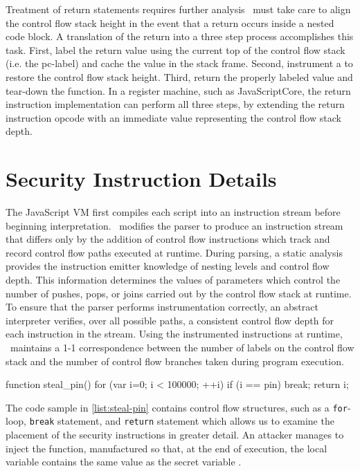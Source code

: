 Treatment of return statements requires further analysis
\FlowCore\ must take care to align the control flow stack height in the event that a return occurs inside a nested code block.
A translation of the return into a three step process accomplishes this task.
First, label the return value using the current top of the control flow stack (i.e. the pc-label) and cache the value in the stack frame.
Second, instrument a \popj to restore the control flow stack height.
Third, return the properly labeled value and tear-down the function.
In a register machine, such as JavaScriptCore, the return instruction implementation can perform all three steps, by extending the return instruction opcode with an immediate value representing the control flow stack depth.

\section{Security Instruction Details}

The JavaScript VM first compiles each script into an instruction stream before beginning interpretation.
\FlowCore\ modifies the parser to produce an instruction stream that differs only by the addition of control flow instructions which track and record control flow paths executed at runtime.
During parsing, a static analysis provides the instruction emitter knowledge of nesting levels and control flow depth.
This information determines the values of parameters which control the number of pushes, pops, or joins carried out by the control flow stack at runtime.
To ensure that the parser performs instrumentation correctly, an abstract interpreter verifies, over all possible paths, a consistent control flow depth for each instruction in the stream.
Using the instrumented instructions at runtime, \FlowCore\ maintains a 1-1 correspondence between the number of labels on the control flow stack and the number of control flow branches taken during program execution.

\begin{jscode}
function steal_pin() {
  for (var i=0; i < 100000; ++i) {
    if (i == pin) break;
  }
  return i;
}
\end{jscode}

The code sample in \autoref{list:steal-pin} contains control flow structures, such as a \texttt{for}-loop, \texttt{break} statement, and \texttt{return} statement which allows us to examine the placement of the security instructions in greater detail.
An attacker manages to inject the  function, manufactured so that, at the end of execution, the local variable  contains the same value as the secret variable .

